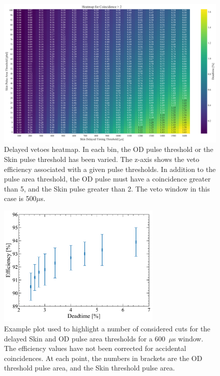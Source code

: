 \begin{figure}
	\centering
	\includegraphics[width=\textwidth]{figures/VetoEfficiency/Skin_Deadtime_thesis.png}
	\caption{Delayed vetoes heatmap.
		In each bin, the OD pulse threshold or the Skin pulse threshold has been varied.
		The z-axis shows the veto efficiency associated with a given pulse thresholds.
		In addition to the pulse area threshold, the OD pulse must have a coincidence greater than 5, and the Skin pulse greater than 2.
		The veto window in this case is 500$\mu$s.}
	\label{fig:VetoEff/skin_delayed_veto_heatmap}
\end{figure}
\fi

\begin{figure}[!ht]
	\centering
	\includegraphics[width=0.7\textwidth]{figures/VetoEfficiency/DeadEffThresholdTest.pdf}
	\caption[Example plot used to highlight a number of considered cuts for the delayed Skin and OD pulse area thresholds for a 600~$\mu$s window.]{Example plot used to highlight a number of considered cuts for the delayed Skin and OD pulse area thresholds for a 600~$\mu$s window. The efficiency values have not been corrected for accidental coincidences. At each point, the numbers in brackets are the OD threshold pulse area, and the Skin threshold pulse area.}
	\label{fig:VetoEff/veto_cut_optimisation}
\end{figure}

